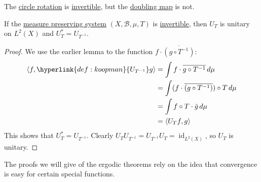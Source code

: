 \documentclass{article}
\begin{document}
\begin{eg}
  The \hyperlink{def:circ}{circle rotation} is \hyperlink{def:inv}{invertible}, but the \hyperlink{def:doubling}{doubling map} is not.
\end{eg}
\begin{lemma}
  If the \hyperlink{def:mps}{measure preserving system} $(X, \mathcal{B}, \mu, T)$ is \hyperlink{def:inv}{invertible}, then \hyperlink{def:koopman}{$U_T$} is unitary on $L^2(X)$ and $U_T^* = U_{T^{-1}}$.
\end{lemma}
\begin{proof}
  We use the earlier lemma to the function $f \cdot \overline{(g \circ T^{-1})}$:
  \begin{align*}
    \langle f, \hyperlink{def:koopman}{U_{T^{-1}}} g \rangle &= \int f \cdot \overline{g \circ T^{-1}} \, d\mu \\
                                    &= \int (f \cdot \overline{(g \circ T^{-1})}) \circ T\,d\mu \\
                                    &= \int f\circ T \cdot \bar{g}\,d\mu \\
                                    &= \langle U_T f, g \rangle
  \end{align*}
  This shows that $U_T^* = U_{T^{-1}}$. Clearly $U_T U_{T^{-1}} = U_{T^{-1}} U_T = \operatorname{id}_{L^2(X)}$, so $U_T$ is unitary.
\end{proof}
The proofs we will give of the ergodic theorems rely on the idea that convergence is easy for certain special functions.
\end{document}

